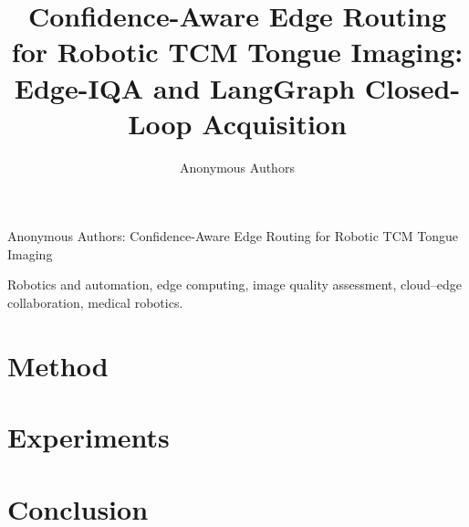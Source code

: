 \documentclass[lettersize,journal]{IEEEtran}
\begin{document}
\title{Confidence-Aware Edge Routing for Robotic TCM Tongue Imaging:\\
Edge-IQA and LangGraph Closed-Loop Acquisition}

\author{Anonymous Authors}

%
{Anonymous Authors: Confidence-Aware Edge Routing for Robotic TCM Tongue Imaging}

\maketitle



\begin{IEEEkeywords}
Robotics and automation, edge computing, image quality assessment, cloud--edge collaboration, medical robotics.
\end{IEEEkeywords}




\section{Method}
\label{sec:method}





\section{Experiments}
\label{sec:experiments}






\section{Conclusion}
\label{sec:conclusion}






\end{document}
